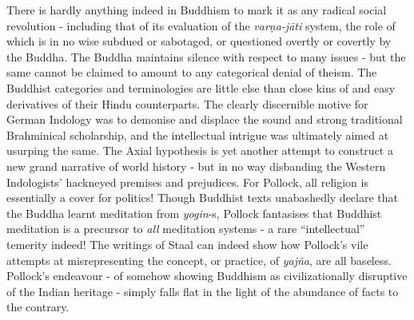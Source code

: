 There is hardly anything indeed in Buddhism to mark it as any radical social revolution - including that of its evaluation of the \textit{varṇa-jāti} system, the role of which is in no wise subdued or sabotaged, or questioned overtly or covertly by the Buddha. The Buddha maintains silence with respect to many issues - but the same cannot be claimed to amount to any categorical denial of theism. The Buddhist categories and terminologies are little else than close kins of and easy derivatives of their Hindu counterparts. The clearly discernible motive for German Indology was to demonise and displace the sound and strong traditional Brahminical scholarship, and the intellectual intrigue was ultimately aimed at usurping the same. The Axial hypothesis is yet another attempt to construct a new grand narrative of world history - but in no way disbanding the Western Indologists’ hackneyed premises and prejudices. For Pollock, all religion is essentially a cover for politics! Though Buddhist texts unabashedly declare that the Buddha learnt meditation from \textit{yogin}-s, Pollock fantasises that Buddhist meditation is a precursor to \textit{all} meditation systems - a rare “intellectual” temerity indeed! The writings of Staal can indeed show how Pollock’s vile attempts at misrepresenting the concept, or practice, of \textit{yajña}, are all baseless. Pollock’s endeavour - of somehow showing Buddhism as civilizationally disruptive of the Indian heritage - simply falls flat in the light of the abundance of facts to the contrary.

